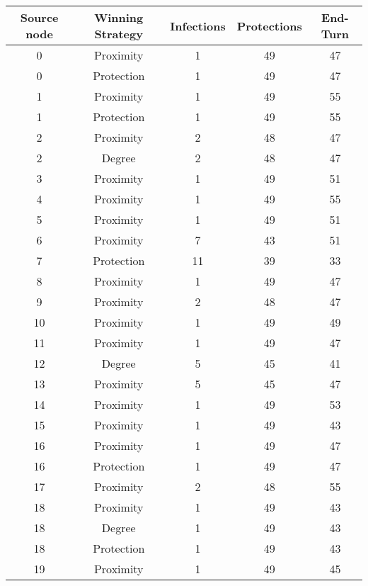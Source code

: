 \documentclass[results.tex]{subfiles}
\begin{document}
\begin{center}
  \begin{tabular}{| c || c | c | c | c |}
    \hline
    {\bfseries Source node} & {\bfseries Winning Strategy} & {\bfseries Infections} & {\bfseries Protections} & {\bfseries End-Turn} \\  %
    \hline\hline
    0 & Proximity & 1 & 49 & 47 \\ 
    \hline
    0 & Protection & 1 & 49 & 47 \\ 
    \hline
    1 & Proximity & 1 & 49 & 55 \\ 
    \hline
    1 & Protection & 1 & 49 & 55 \\ 
    \hline
    2 & Proximity & 2 & 48 & 47 \\ 
    \hline
    2 & Degree & 2 & 48 & 47 \\ 
    \hline
    3 & Proximity & 1 & 49 & 51 \\ 
    \hline
    4 & Proximity & 1 & 49 & 55 \\ 
    \hline
    5 & Proximity & 1 & 49 & 51 \\ 
    \hline
    6 & Proximity & 7 & 43 & 51 \\ 
    \hline
    7 & Protection & 11 & 39 & 33 \\ 
    \hline
    8 & Proximity & 1 & 49 & 47 \\ 
    \hline
    9 & Proximity & 2 & 48 & 47 \\ 
    \hline
    10 & Proximity & 1 & 49 & 49 \\ 
    \hline
    11 & Proximity & 1 & 49 & 47 \\ 
    \hline
    12 & Degree & 5 & 45 & 41 \\ 
    \hline
    13 & Proximity & 5 & 45 & 47 \\ 
    \hline
    14 & Proximity & 1 & 49 & 53 \\ 
    \hline
    15 & Proximity & 1 & 49 & 43 \\ 
    \hline
    16 & Proximity & 1 & 49 & 47 \\ 
    \hline
    16 & Protection & 1 & 49 & 47 \\ 
    \hline
    17 & Proximity & 2 & 48 & 55 \\ 
    \hline
    18 & Proximity & 1 & 49 & 43 \\ 
    \hline
    18 & Degree & 1 & 49 & 43 \\ 
    \hline
    18 & Protection & 1 & 49 & 43 \\ 
    \hline
    19 & Proximity & 1 & 49 & 45 \\ 

\end{tabular}
\end{center}
\end{document}
